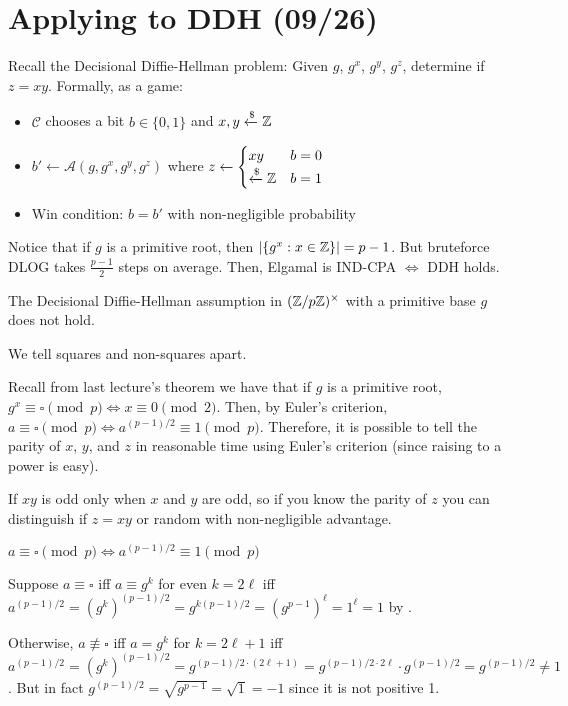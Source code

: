 \documentclass[notes]{agony}
\newcommand{\xgets}{\xleftarrow}
\newcommand{\ndgets}{\xgets{\mathdollar}}
\begin{document}
\section{Applying to DDH (09/26)}

Recall the Decisional Diffie-Hellman problem:
Given $g$, $g^x$, $g^y$, $g^z$, determine if $z = xy$. Formally, as a game:
\begin{itemize}[nosep]
  \item $\mathcal C$ chooses a bit $b \in \{0,1\}$ and $x,y \ndgets\Z$
  \item $b' \gets \mathcal A(g, g^x, g^y, g^z)$ where $z \gets \begin{cases}xy & b = 0 \\ \ndgets\Z & b = 1\end{cases}$
  \item Win condition: $b = b'$ with non-negligible probability
\end{itemize}
Notice that if $g$ is a primitive root, then $\abs{\{g^x : x \in \mathbb{Z}\}}=p-1$.
But bruteforce DLOG takes $\frac{p-1}{2}$ steps on average.
Then, Elgamal is IND-CPA $\iff$ DDH holds.

\begin{prop}
  The Decisional Diffie-Hellman assumption in $(\mathbb{Z}/p\mathbb{Z})^\times$
  with a primitive base $g$ does not hold.
\end{prop}
\begin{prf}
  We tell squares and non-squares apart.

  Recall from last lecture's theorem we have that if $g$ is a primitive root,
  $g^x \equiv \square \pmod p \iff x \equiv 0 \pmod 2$.
  Then, by Euler's criterion, $a \equiv \square \pmod p \iff a^{(p-1)/2} \equiv 1 \pmod p$.
  Therefore, it is possible to tell the parity of $x$, $y$, and $z$
  in reasonable time using Euler's criterion (since raising to a power is easy).

  If $xy$ is odd only when $x$ and $y$ are odd,
  so if you know the parity of $z$ you can distinguish if $z=xy$
  or random with non-negligible advantage.
\end{prf}

\begin{prop}
  $a \equiv \square \pmod p \iff a^{(p-1)/2} \equiv 1 \pmod p$
\end{prop}
\begin{prf}
  Suppose $a \equiv \square$ iff $a \equiv g^k$ for even $k=2\ell$
  iff $a^{(p-1)/2} = (g^k)^{(p-1)/2} = g^{k(p-1)/2}=(g^{p-1})^\ell=1^\ell=1$ by \FLT{}.

  Otherwise, $a \not\equiv \square$ iff $a = g^k$ for $k=2\ell+1$
  iff $a^{(p-1)/2} = (g^k)^{(p-1)/2} = g^{(p-1)/2 \cdot (2\ell+1)}=g^{(p-1)/2\cdot 2\ell}\cdot g^{(p-1)/2} = g^{(p-1)/2} \neq 1$.
  But in fact $g^{(p-1)/2} = \sqrt{g^{p-1}} = \sqrt{1} = -1$ since it is not positive 1.
\end{prf}
\end{document}
